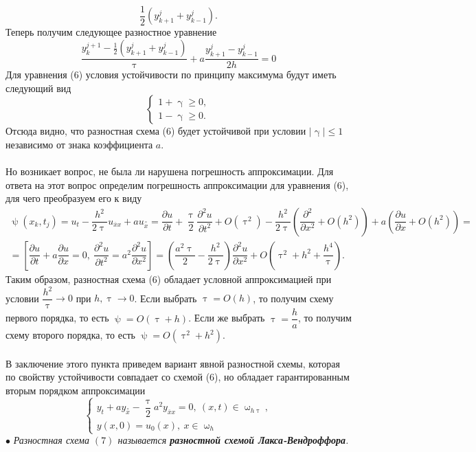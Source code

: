 \documentclass[a4paper, 12pt]{report}
\numberwithin{equation}{section}
\newcommand{\ol}{\overline}
\renewcommand{\leq}{\leqslant}
\renewcommand{\geq}{\geqslant}
\renewcommand{\gamma}{\upgamma}
\renewcommand{\tau}{\uptau}
\renewcommand{\psi}{\uppsi}
\renewcommand{\omega}{\upomega}
\renewcommand{\d}{\partial}
\begin{document}
		 $$\dfrac 12 (y_{k+1}^j + y_{k-1}^j).$$
		 Теперь получим следующее разностное уравнение
		 \begin{equation}
		 	\dfrac{y_k^{j+1} - \frac 12 (y_{k+1}^j + y_{k-1}^j) }{\tau} + a \dfrac{y_{k+1}^j - y_{k-1}^j}{2h} = 0 
		 \end{equation}
		 Для уравнения (6) условия устойчивости по принципу максимума будут иметь следующий вид
		 $$\begin{cases}
		 	1+\gamma \geq 0,\\
		 	1 - \gamma \geq 0.
		 \end{cases}$$
		 Отсюда видно, что разностная схема (6) будет устойчивой при условии $|\gamma|\leq 1$ независимо от знака коэффициента $a$.\\\\
		 Но возникает вопрос, не была ли нарушена погрешность аппроксимации. Для ответа на этот вопрос определим погрешность аппроксимации для уравнения (6), для чего преобразуем его к виду
		 \begin{multline*}
		 	\psi(x_k, t_j) = u_t - \dfrac{h^2}{2\tau} u_{\ol x x} + a u_{\overset{\circ}x} = \dfrac{\d u}{\d t} + \dfrac \tau 2 \dfrac{\d ^2 u}{\d t^2} + O(\tau^2) - \dfrac {h^2}{2\tau} \left( \dfrac{\d ^2}{\d x^2} + O(h^2) \right) + a \left(\dfrac {\d u}{\d x} + O(h^2)\right)=\\
		 	=\left[ \dfrac{\d u}{\d t}+ a \dfrac{\d u}{\d x} = 0,\ \dfrac{\d^2 u}{\d t^2}= a^2 \dfrac{\d^2 u}{\d x^2}\right] = \left(\dfrac{a^2 \tau}{2} - \dfrac {h^2}{2\tau}\right)\dfrac{\d ^2u}{\d x^2} + O(\tau^2 + h^2 + \dfrac {h^4}\tau).
		 \end{multline*}
		 Таким образом, разностная схема (6) обладает условной аппроксимацией при условии $\dfrac {h^2}\tau \to 0$ при $h,\tau \to 0$. Если выбрать $\tau = O(h)$, то получим схему первого порядка, то есть $\psi = O(\tau + h)$. Если же выбрать $\tau = \dfrac h a$, то получим схему второго порядка, то есть
		 $\psi = O(\tau^2 + h^2)$.
		 \\\\
		 В заключение этого пункта приведем вариант явной разностной схемы, которая по свойству устойчивости совпадает со схемой (6), но обладает гарантированным вторым порядком аппроксимации
		 \begin{equation}
		 	\begin{cases}
		 		y_t + ay_{\overset{\circ}x} - \dfrac \tau 2 a^2 y_{\ol x x} = 0,\ (x,t) \in \omega_{h\tau},\\
		 		y(x,0) = u_0(x),\ x \in \omega_h
		 	\end{cases}
		 \end{equation}
		 $\bullet$ \textit{Разностная схема $(7)$ называется \textbf{разностной схемой Лакса-Вендроффора}.}
\end{document}
